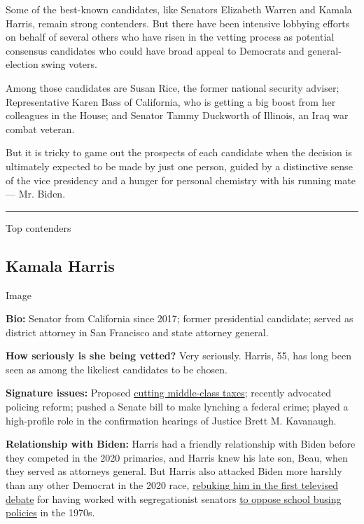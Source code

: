 Some of the best-known candidates, like Senators Elizabeth Warren and
Kamala Harris, remain strong contenders. But there have been intensive
lobbying efforts on behalf of several others who have risen in the
vetting process as potential consensus candidates who could have broad
appeal to Democrats and general-election swing voters.

Among those candidates are Susan Rice, the former national security
adviser; Representative Karen Bass of California, who is getting a big
boost from her colleagues in the House; and Senator Tammy Duckworth of
Illinois, an Iraq war combat veteran.

But it is tricky to game out the prospects of each candidate when the
decision is ultimately expected to be made by just one person, guided by
a distinctive sense of the vice presidency and a hunger for personal
chemistry with his running mate --- Mr. Biden.

\begin{center}\rule{0.5\linewidth}{\linethickness}\end{center}

Top contenders

\hypertarget{kamala-harris}{%
\subsection{Kamala Harris}\label{kamala-harris}}

Image

\textbf{Bio:} Senator from California since 2017; former presidential
candidate; served as district attorney in San Francisco and state
attorney general.

\textbf{How seriously is she being vetted?} Very seriously. Harris, 55,
has long been seen as among the likeliest candidates to be chosen.

\textbf{Signature issues:} Proposed
\href{https://www.nytimes3xbfgragh.onion/2019/05/01/us/politics/cory-booker-kamala-harris-2020.html}{cutting
middle-class taxes}; recently advocated policing reform; pushed a Senate
bill to make lynching a federal crime; played a high-profile role in the
confirmation hearings of Justice Brett M. Kavanaugh.

\textbf{Relationship with Biden:} Harris had a friendly relationship
with Biden before they competed in the 2020 primaries, and Harris knew
his late son, Beau, when they served as attorneys general. But Harris
also attacked Biden more harshly than any other Democrat in the 2020
race,
\href{https://www.nytimes3xbfgragh.onion/2019/07/31/us/politics/kamala-harris-biden-busing.html}{rebuking
him in the first televised debate} for having worked with segregationist
senators
\href{https://www.nytimes3xbfgragh.onion/2019/07/15/us/politics/biden-busing.html?action=click\&module=RelatedLinks\&pgtype=Article}{to
oppose school busing policies} in the 1970s.

